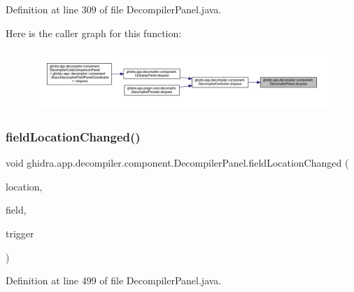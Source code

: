 Definition at line 309 of file Decompiler\+Panel.\+java.

Here is the caller graph for this function\+:
\nopagebreak
\begin{figure}[H]
\begin{center}
\leavevmode
\includegraphics[width=350pt]{classghidra_1_1app_1_1decompiler_1_1component_1_1_decompiler_panel_a5a760268786c72bb8307a1cc11e1e3d0_icgraph}
\end{center}
\end{figure}
\mbox{\label{classghidra_1_1app_1_1decompiler_1_1component_1_1_decompiler_panel_aa74cc3489415646273d63b999b658e30}} 
\subsubsection{\texorpdfstring{fieldLocationChanged()}{fieldLocationChanged()}}
{\footnotesize\ttfamily void ghidra.\+app.\+decompiler.\+component.\+Decompiler\+Panel.\+field\+Location\+Changed (\begin{DoxyParamCaption}\item[{Field\+Location}]{location,  }\item[{Field}]{field,  }\item[{Event\+Trigger}]{trigger }\end{DoxyParamCaption})\hspace{0.3cm}{\ttfamily [inline]}}



Definition at line 499 of file Decompiler\+Panel.\+java.

